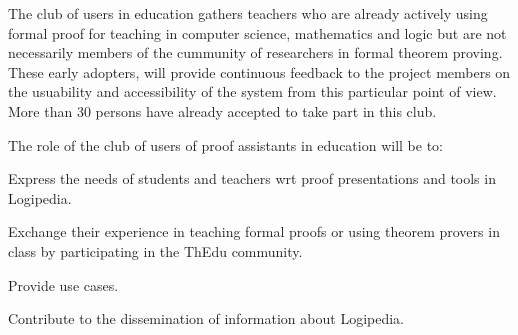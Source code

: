 \begin{workpackage}[id=dissemination,wphases=0-48,type=MGT,
  short=Dissemination,%
  title={Dissemination, communication and exploitation},
  lead=Inr]
\begin{tasklist}
  \begin{task}[id=teachers-club,
      title=Expanding the use of Logipedia in education,
      lead=Str,StrRM=2] The club of users in education gathers
    teachers who are already actively using formal proof for teaching
    in computer science, mathematics and logic but are not necessarily
    members of the cummunity of researchers in formal theorem
    proving. These early adopters, will provide continuous feedback to
    the project members on the usuability and accessibility of the
    system from this particular point of view.  More than 30 persons
    have already accepted to take part in this club.



    The role of the club of users of proof assistants in education will be to:
    \begin{compactitem}
    \item Express the needs of students and teachers wrt proof
      presentations and tools in Logipedia.
    \item Exchange their experience in teaching formal proofs or using
      theorem provers in class by participating in the ThEdu community.
    \item Provide use cases.
    \item Contribute to the dissemination of information about Logipedia.
    \end{compactitem}


\end{task}
\end{tasklist}
\end{workpackage}
